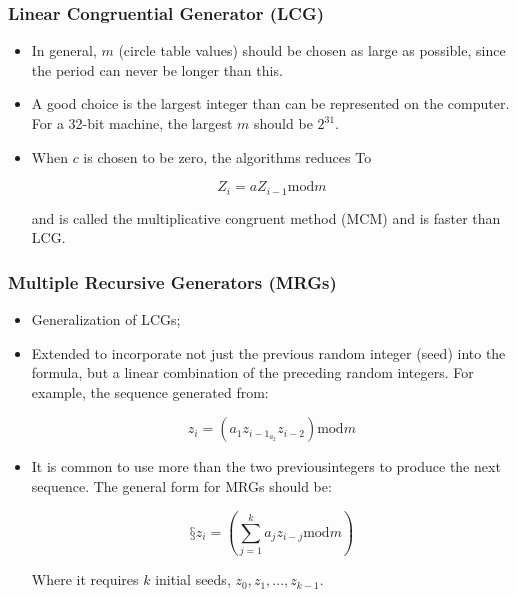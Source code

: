 \begin{frame}
    \frametitle{Linear Congruential Generator (LCG)}
    
    \begin{itemize}
    \item In general, $m$ (circle table values) should be chosen as large as possible,
    since the period can never be longer than this.

    \item A good choice is the largest integer than can be represented on the computer. 
    For a 32-bit machine, the largest $m$ should be $2^{31}$.

    \item When $c$ is chosen to be zero, the algorithms reduces To

    $$Z_i = aZ_{i-1} \text{mod}m$$

    and is called the multiplicative congruent method (MCM) and is faster
    than LCG.

    \end{itemize}
\end{frame}



\begin{frame}
    \frametitle{Multiple Recursive Generators (MRGs)}
    
    \begin{itemize}
        \item Generalization of LCGs;

        \item Extended to incorporate not just the previous random integer (seed)
        into the formula, but a linear combination of the preceding random
        integers. For example, the sequence generated from:

        $$z_i = (a_1z_{i-1} _ a_2z_{i-2}) \text{mod} m$$
        
        \item It is common to use more than the two previousintegers to produce the 
        next sequence. The general form for MRGs should be:

        $$§z_i = \left(\sum_{j=1}^{k}a_jz_{i-j}\text{mod}m\right)$$

        Where it requires $k$ initial seeds, $z_0, z_1,...,z_{k-1}$.
    
    \end{itemize}
\end{frame}



